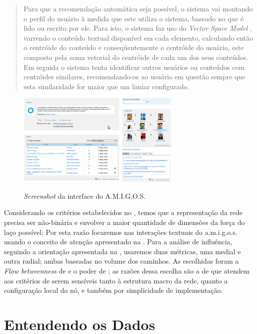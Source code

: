 \begin{quote}{\citep{RicardoAraujoCosta2008}}
\begin{description}
	Para que a recomendação automática seja possível, o sistema vai montando o
	perfil do usuário à medida que este utiliza o sistema, baseado no que é lido ou
	escrito por ele. Para isto, o sistema faz uso do \emph{Vector Space Model}
	\citep{Barros2002}, varrendo o conteúdo textual disponível em cada elemento,
	calculando então o centróide do conteúdo e conseqüentemente o centróide do
	usuário, este composto pela soma vetorial do centróide de cada um dos seus
	conteúdos. Em seguida o sistema tenta identificar outros usuários ou conteúdos
	com centróides similares, recomendando-os ao usuário em questão sempre que
	esta similaridade for maior que um limiar configurado.
	\end{description}
\end{quote}

\begin{figure}[h!]
  \caption{\emph{Screenshot} da interface do A.M.I.G.O.S.}
  \centering
    \includegraphics[width=0.7\textwidth]{imgs/screenshot-amigos.png}
    \label{ap:fig:screenshot}
\end{figure}

Considerando os critérios estabelecidos no , temos que a
representação da rede precisa ser não-binária e envolver a maior quantidade de
dimensões da força do laço possível; Por esta razão focaremos nas interações
textuais do a.m.i.g.o.s. usando o conceito de atenção apresentado na
. Para a análise de influência, seguindo a orientação
apresentada na , usaremos duas métricas, uma medial e
outra radial; ambas baseadas no volume dos caminhos. As escolhidas foram a
\emph{Flow betweenness} de \citeauthor{Freeman1991} e o poder de
\citeauthor{Bonacich1987}; as razões dessa escolha são a de que atendem aos
critérios de serem sensíveis tanto à estrutura macro da rede, quanto a
configuração local do nó, e também por simplicidade de implementação.

 

\section{Entendendo os Dados}
\label{ap:sec:dados}

